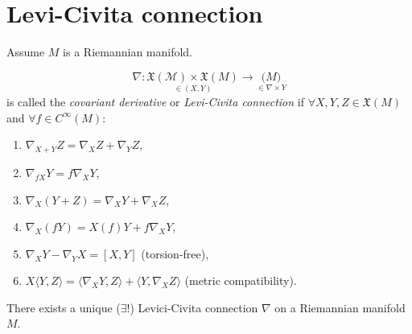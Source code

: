 \section{Levi-Civita connection}

Assume $M$ is a Riemannian manifold.

\begin{definition}\label{def:5.1}
\[
\nabla : \underset{\in (X,Y)}{\mathcal{\mathfrak{X}(M)}\times\mathfrak{X}(M)} \to \underset{\in \nabla \times Y}{\mathfrak(M)}
\]
is called the \emph{covariant derivative} or \emph{Levi-Civita connection} if
$\forall X, Y, Z \in \mathfrak{X}(M)$ and $\forall f \in C^{\infty}(M)$:
\begin{enumerate}[label=(\arabic*), ref=Definition \thedefinition~(\arabic*)]
    \item \label{def:5.1.1} $\nabla_{X+Y}Z = \nabla_X Z + \nabla_Y Z$,
    \item \label{def:5.1.2} $\nabla_{fX}Y = f\nabla_X Y$,
    \item \label{def:5.1.3} $\nabla_X(Y+Z) = \nabla_X Y + \nabla_X Z$,
    \item \label{def:5.1.4} $\nabla_X(fY) = X(f)Y + f\nabla_X Y$,
    \item \label{def:5.1.5} $\nabla_X Y - \nabla_Y X = [X,Y]$ (torsion-free),
    \item \label{def:5.1.6} $X\langle Y, Z \rangle = \langle \nabla_X Y, Z \rangle + \langle Y, \nabla_X Z \rangle$ (metric compatibility).
\end{enumerate}
\end{definition}

\begin{theorem}\label{thm:5.2}
There exists a unique ($\exists !$) Levici-Civita connection $\nabla$ on a Riemannian manifold $M$.
\end{theorem}

